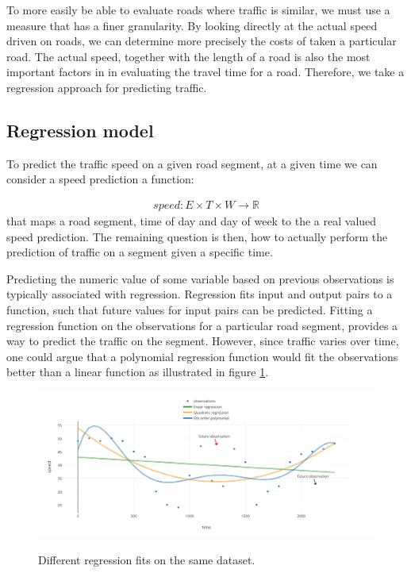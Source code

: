 To more easily be able to evaluate roads where traffic is similar, we must use a measure that has a finer granularity. By looking directly at the actual speed driven on roads, we can determine more precisely the costs of taken a particular road. The actual speed, together with the length of a road is also the most important factors in in evaluating the travel time for a road. Therefore, we take a regression approach for predicting traffic.
\subsection{Regression model}\label{patterns:regression-model}
To predict the traffic speed on a given road segment, at a given time we can consider a speed prediction a function:

\begin{align}\label{eq:speed}
speed: E \times T \times W \rightarrow \mathbb{R}
\end{align}
that maps a road segment, time of day and day of week to the a real valued speed prediction. The remaining question is then, how to actually perform the prediction of traffic on a segment given a specific time. \par
Predicting the numeric value of some variable based on previous observations is typically associated with regression. Regression fits input and output pairs to a function, such that future values for input pairs can be predicted. Fitting a regression function on the observations for a particular road segment, provides a way to predict the traffic on the segment. However, since traffic varies over time, one could argue that a polynomial regression function would fit the observations better than a linear function as illustrated in figure \ref{fig:compare-regression}.
\begin{figure}
\includegraphics[width=\textwidth]{figures/compare-regression.pdf}
\label{fig:compare-regression}
\caption{Different regression fits on the same dataset.}
\end{figure}
